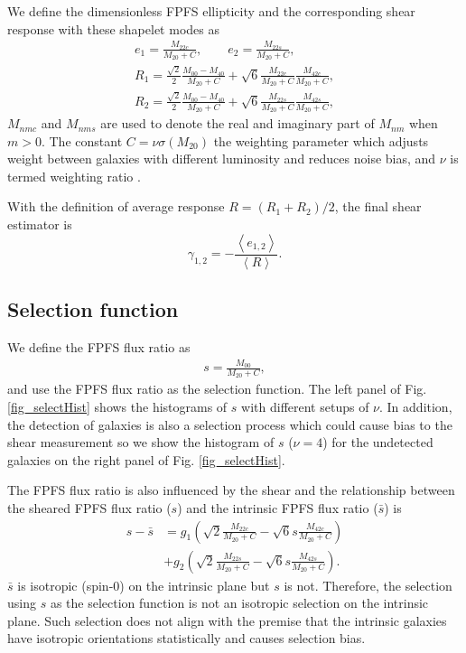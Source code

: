 \documentclass[a4paper,fleqn,usenatbib]{mnras}
\begin{document}
We define the dimensionless FPFS ellipticity and the corresponding shear
response with these shapelet modes as
\begin{align}\label{ellipticity_define}
e_1=\frac{M_{22c}}{M_{20}+C},\qquad
e_2=\frac{M_{22s}}{M_{20}+C},\\
R_{1}=\frac{\sqrt{2}}{2}\frac{M_{00}-M_{40}}{M_{20}+C}
    +\sqrt{6}\frac{M_{22c}}{M_{20}+C}\frac{M_{42c}}{M_{20}+C},\\
R_{2}=\frac{\sqrt{2}}{2}\frac{M_{00}-M_{40}}{M_{20}+C}
    +\sqrt{6}\frac{M_{22s}}{M_{20}+C}\frac{M_{42s}}{M_{20}+C},
\end{align}
$M_{nmc}$ and $M_{nms}$ are used to denote the real and imaginary part of
$M_{nm}$ when $m>0$. The constant $C=\nu \sigma(M_{20})$ the weighting
parameter which adjusts weight between galaxies with different luminosity and
reduces noise bias, and $\nu$ is termed weighting ratio \citep{FPFS-Li2018}.

With the definition of average response $R= (R_1+R_2)/2$, the final shear
estimator is
\begin{equation}
\gamma_{1,2} =-\frac{\left\langle e_{1,2}
\right\rangle}{\left\langle R \right\rangle}.
\end{equation}

\subsection{Selection function}
\label{sec:Method-select}

We define the FPFS flux ratio as
\begin{align}\label{select_define}
s = \frac{M_{00}}{M_{20}+C},
\end{align}
and use the FPFS flux ratio as the selection function.
The left panel of Fig. \ref{fig_selectHist} shows the histograms of $s$ with
different setups of $\nu$. In addition, the detection of galaxies is also a
selection process which could cause bias to the shear measurement so we show
the histogram of $s$ ($\nu=4$) for the undetected galaxies on the right panel
of Fig. \ref{fig_selectHist}.

The FPFS flux ratio is also influenced by the shear and the relationship
between the sheared FPFS flux ratio ($s$) and the intrinsic FPFS flux ratio
($\bar{s}$) is
\begin{align}\label{select_transform}
s-\bar{s} &=g_1 (\sqrt{2}\frac{M_{22c}}{M_{20}+C}
    -\sqrt{6}s\frac{M_{42c}}{M_{20}+C}) \\
    &+g_2 (\sqrt{2}\frac{M_{22s}}{M_{20}+C}
    -\sqrt{6}s\frac{M_{42s}}{M_{20}+C}).
\end{align}
$\bar{s}$ is isotropic (spin-0) on the intrinsic plane but $s$ is not.
Therefore, the selection using $s$ as the selection function is not an
isotropic selection on the intrinsic plane. Such selection does not align with
the premise that the intrinsic galaxies have isotropic orientations
statistically and causes selection bias.
\end{document}
